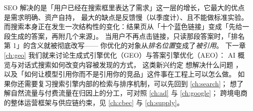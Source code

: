 SEO 解决的是「用户已经在搜索框里表达了需求」这一层的增长，它最大的优点是需求明确、资产自持，
最大的缺点是反馈慢（以季度计）、且不能做标准实验。
而搜索本身正在发生一次结构性的变化：结果页从「十个蓝色链接」变成「先给一段生成的答案，再附几个来源」。
当用户不再点击链接，只读那段答案时，「排名第 1」的含义就被彻底改写——
你优化的对象从\emph{排名位置}变成了\emph{被引用}。
下一章 \cref{ch:geo} 我们就来讨论生成式引擎优化（GEO）与答案引擎优化（AEO）：
AI 概览与对话式搜索如何改变内容被发现的方式，
 这类新兴约定 \cite{openaillmstxt} 想解决什么问题 \cite{google2024ai_overviews}，
以及「如何让模型引用你而不是引用你的竞品」这件事在工程上可以怎么做。
如果你还需要复习搜索引擎内部的检索与排序机制，可以先回到 \cref{ch:search}；
想了解自然流量与付费流量在归因上的分工，可对照 \cref{ch:ad} 与 \cref{ch:google}；
跨境电商的整体运营框架与供应链约束，见 \cref{ch:cbec} 与 \cref{ch:supply}。
